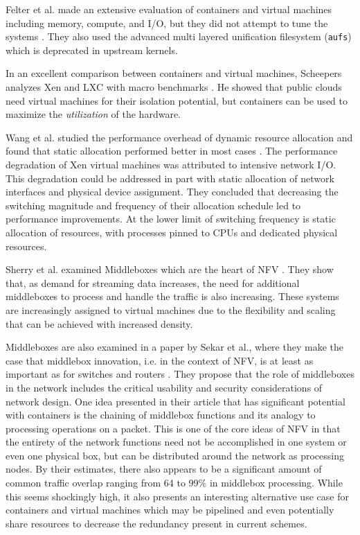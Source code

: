 Felter et al. made an extensive evaluation of containers and virtual machines including memory, compute, and I/O, but they did not attempt to tune the systems \autocite{_felter_1}.
They also used the advanced multi layered unification filesystem (\texttt{aufs}) which is deprecated in upstream kernels.

In an excellent comparison between containers and virtual machines, Scheepers analyzes Xen and LXC with macro benchmarks \autocite{_scheepers_1}.  
He showed that public clouds need virtual machines for their isolation potential, but containers can be used to maximize the \emph{utilization} of the hardware.

Wang et al. studied the performance overhead of dynamic resource allocation and found that static allocation performed better in most cases \autocite{wangAllocation2007}.
The performance degradation of Xen virtual machines was attributed to intensive network I/O.
This degradation could be addressed in part with static allocation of network interfaces and physical device assignment.
They concluded that decreasing the switching magnitude and frequency of their allocation schedule led to performance improvements.
At the lower limit of switching frequency is static allocation of resources, with processes pinned to CPUs and dedicated physical resources.

Sherry et al. examined Middleboxes which are the heart of NFV \autocite{sherry2012making}.
They show that, as demand for streaming data increases, the need for additional middleboxes to process and handle the traffic is also increasing.
These systems are increasingly assigned to virtual machines due to the flexibility and scaling that can be achieved with increased density.

Middleboxes are also examined in a paper by Sekar et al., where they make the case that middlebox innovation, i.e. in the context of NFV, is at least as important as for switches and routers \autocite{sekar2011middlebox}.
They propose that the role of middleboxes in the network includes the critical usability and security considerations of network design.
One idea presented in their article that has significant potential with containers is the chaining of middlebox functions and its analogy to processing operations on a packet.  
This is one of the core ideas of NFV in that the entirety of the network functions need not be accomplished in one system or even one physical box, but can be distributed around the network as processing nodes.  
By their estimates, there also appears to be a significant amount of common traffic overlap ranging from 64 to 99\% in middlebox processing. 
While this seems shockingly high, it also presents an interesting alternative use case for containers and virtual machines which may be pipelined and even potentially share resources to decrease the redundancy present in current schemes.

